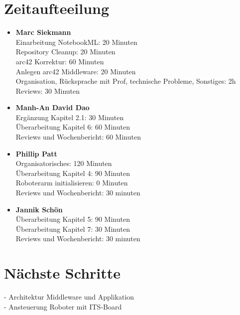 \documentclass{article}
\begin{document}
\clearpage
\section{Zeitaufteeilung}

\begin{itemize}
\item \textbf{Marc Siekmann} \\
Einarbeitung NotebookML: 20 Minuten\\
Repository Cleanup: 20 Minuten\\
arc42 Korrektur: 60 Minuten\\
Anlegen arc42 Middleware: 20 Minuten\\
Organisation, Rücksprache mit Prof, technische Probleme, Sonstiges: 2h\\
Reviews: 30 Minuten

\item \textbf{Manh-An David Dao}\\
Ergänzung Kapitel 2.1: 30 Minuten\\
Überarbeitung Kapitel 6: 60 Minuten\\
Reviews und Wochenbericht: 60 Minuten\\ 

\item \textbf{Phillip Patt}\\
Organisatorisches: 120 Minuten \\ 
Überarbeitung Kapitel 4: 90 Minuten \\ 
Roboterarm initialisieren: 0 Minuten\\ 
Reviews und Wochenbericht: 30 minuten \\

\item \textbf{Jannik Schön}\\
Überarbeitung Kapitel 5: 90 Minuten \\ 
Überarbeitung Kapitel 7: 30 Minuten \\
Reviews und Wochenbericht: 30 minuten \\

\end{itemize}


\section{Nächste Schritte}
- Architektur Middleware und Applikation\\
- Ansteuerung Roboter mit ITS-Board
\end{document}
